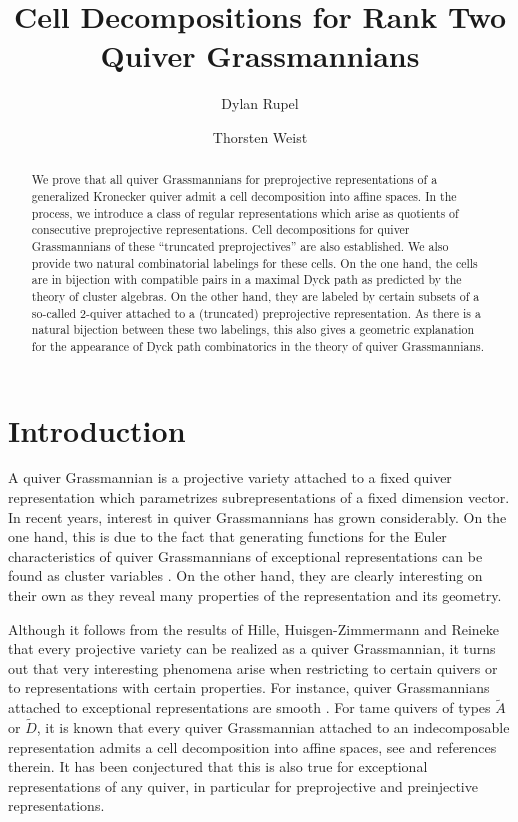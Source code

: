 \documentclass{amsart}
\title{Cell Decompositions for Rank Two Quiver Grassmannians}
\author{Dylan Rupel}
\author{Thorsten Weist}
\numberwithin{equation}{section}
\begin{document}
\begin{abstract}
  We prove that all quiver Grassmannians for preprojective representations of a generalized Kronecker quiver admit a cell decomposition into affine spaces.  
  In the process, we introduce a class of regular representations which arise as quotients of consecutive preprojective representations.
  Cell decompositions for quiver Grassmannians of these ``truncated preprojectives'' are also established. 
  We also provide two natural combinatorial labelings for these cells.
  On the one hand, the cells are in bijection with compatible pairs in a maximal Dyck path as predicted by the theory of cluster algebras.
  On the other hand, they are labeled by certain subsets of a so-called $2$-quiver attached to a (truncated) preprojective representation.
  As there is a natural bijection between these two labelings, this also gives a geometric explanation for the appearance of Dyck path combinatorics in the theory of quiver Grassmannians. 
\end{abstract}

\setcounter{tocdepth}{2}

\maketitle

\tableofcontents
\section{Introduction}
\noindent A quiver Grassmannian is a projective variety attached to a fixed quiver representation which parametrizes subrepresentations of a fixed dimension vector.
In recent years, interest in quiver Grassmannians has grown considerably.
On the one hand, this is due to the fact that generating functions for the Euler characteristics of quiver Grassmannians of exceptional representations can be found as cluster variables \cite{ck}.
On the other hand, they are clearly interesting on their own as they reveal many properties of the representation and its geometry.

Although it follows from the results of Hille, Huisgen-Zimmermann and Reineke that every projective variety can be realized as a quiver Grassmannian, 
it turns out that very interesting phenomena arise when restricting to certain quivers or to representations with certain properties.
For instance, quiver Grassmannians attached to exceptional representations are smooth \cite{cr}.
For tame quivers of types $\tilde A$ or $\tilde D$, it is known that every quiver Grassmannian attached to an indecomposable representation admits a cell decomposition into affine spaces, see \cite{ce,lw} and references therein.
It has been conjectured that this is also true for exceptional representations of any quiver, in particular for preprojective and preinjective representations. 
\end{document}
